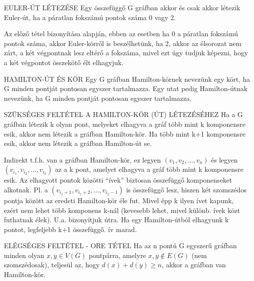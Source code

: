 \begin{tetel}{EULER-ÚT LÉTEZÉSE}
Egy összefüggő G gráfban akkor és csak akkor létezik Euler-út, ha a páratlan fokszámú pontok száma 0 vagy 2.
\end{tetel}

\begin{bizonyitas}{}
Az előző tétel bizonyítása alapján, ebben az esetben ha 0 a páratlan fokszámú pontok száma, akkor Euler-körről is beszélhetünk, ha 2, akkor az élsorozat nem zárt, a két végpontnak lesz eltérő a fokszáma, mivel ezt úgy tudjuk képezni, hogy a két végpontot összekötő élt elhagyjuk.
\end{bizonyitas}

\begin{definicio}{HAMILTON-ÚT ÉS KÖR}
Egy G gráfban Hamilton-körnek nevezünk egy kört, ha G minden pontját pontosan egyszer tartalmazza. Egy utat pedig Hamilton-útnak nevezünk, ha G minden pontját pontosan egyszer tartalmazza.
\end{definicio}

\begin{tetel}{SZÜKSÉGES FELTÉTEL A HAMILTON-KÖR (ÚT) LÉTEZÉSÉHEZ}
Ha a G gráfban létezik k olyan pont, melyeket elhagyva a gráf több mint k komponensre esik, akkor nem létezik a gráfban Hamilton-kör. Ha több mint k+1 komponensre esik, akkor nem létezik a gráfban Hamilton-út se.
\end{tetel}

\begin{bizonyitas}{}
Indirekt t.f.h. van a gráfban Hamilton-kör, ez legyen $(v_1, v_2,..., v_n)$ és legyen $(v_{i_1}, v_{i_2},...,v_{i_k})$ az a k pont, amelyet elhagyva a gráf több mint k komponensre esik. Az elhagyott pontok közötti ``ívek'' biztosan összefüggő komponenseket alkotnak. Pl. a $(v_{i_{1}+1}, v_{i_{1}+2},..., v_{i_{2}-1})$ is összefüggő lesz, hiszen két szomszédos pontja között az eredeti Hamilton-kör éle fut. Mivel épp k ilyen ívet kapunk, ezért nem lehet több komponens k-nál (kevesebb lehet, mivel különb. ívek közt futhatnak élek). U.a. bizonyítjuk útra. Ha egy Hamilton-útból elhagyunk k pontot, legfeljebb k+1 összefüggő. ív marad.
\end{bizonyitas}

\begin{tetel}{ELÉGSÉGES FELTÉTEL - ORE TÉTEL}
Ha az n pontú G egyszerű gráfban minden olyan $x,y\in V(G)$ pontpárra, amelyre ${x,y}\not\in E(G)$ (nem szomszédosak), teljesül az, hogy $d(x) + d(y) \geq n$, akkor a gráfban van Hamilton-kör.
\end{tetel}


